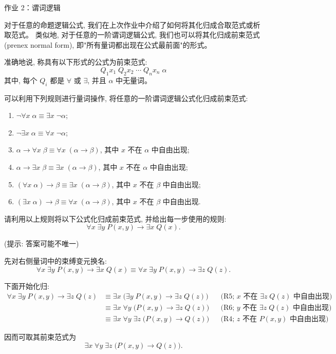\begin{frame}[allowframebreaks]{作业 2：谓词逻辑}
\begin{problem}
  对于任意的命题逻辑公式,
  我们在上次作业中介绍了如何将其化归成合取范式或析取范式。
  类似地, 对于任意的一阶谓词逻辑公式,
  我们也可以将其化归成前束范式 (prenex normal form),
  即"所有量词都出现在公式最前面"的形式。

  准确地说, 称具有以下形式的公式为前束范式:
  \[
    Q_1 x_1\; Q_2 x_2\; \cdots\; Q_n x_n\; \alpha
  \]
  其中, 每个 $Q_i$ 都是 $\forall$ 或 $\exists$,
  并且 $\alpha$ 中无量词。

  可以利用下列规则进行量词操作, 将任意的一阶谓词逻辑公式化归成前束范式:
  \begin{enumerate}
    \item[(R1)] $\lnot \forall x\; \alpha \equiv \exists x\; \lnot \alpha$;
    \item[(R2)] $\lnot \exists x\; \alpha \equiv \forall x\; \lnot \alpha$;
    \item[(R3)] $\alpha \to \forall x\; \beta \equiv \forall x\; (\alpha \to \beta)$,
      其中 $x$ 不在 $\alpha$ 中自由出现;
    \item[(R4)] $\alpha \to \exists x\; \beta \equiv \exists x\; (\alpha \to \beta)$,
      其中 $x$ 不在 $\alpha$ 中自由出现;
    \item[(R5)] $(\forall x\; \alpha) \to \beta \equiv \exists x\; (\alpha \to \beta)$,
      其中 $x$ 不在 $\beta$ 中自由出现;
    \item[(R6)] $(\exists x\; \alpha) \to \beta \equiv \forall x\; (\alpha \to \beta)$,
      其中 $x$ 不在 $\beta$ 中自由出现.
  \end{enumerate}

  请利用以上规则将以下公式化归成前束范式,
  并给出每一步使用的规则:
  \[
    \forall x\; \exists y\; P(x, y) \to \exists x\; Q(x).
  \]

  (提示: 答案可能不唯一)
\end{problem}

\begin{solution}
  先对右侧量词中的束缚变元换名:
  \[
    \forall x\; \exists y\; P(x, y) \to \exists x\; Q(x)
    \equiv
    \forall x\; \exists y\; P(x, y) \to \exists z\; Q(z).
  \]

  下面开始化归:
  \begin{align*}
    \forall x\; \exists y\; P(x, y) \to \exists z\; Q(z)
      &\equiv \exists x\; \big(\exists y\; P(x, y) \to \exists z\; Q(z)\big)
        && \text{(R5; $x$ 不在 $\exists z\; Q(z)$ 中自由出现)} \\
      &\equiv \exists x\; \forall y\; \big(P(x, y) \to \exists z\; Q(z)\big)
        && \text{(R6; $y$ 不在 $\exists z\; Q(z)$ 中自由出现)} \\
      &\equiv \exists x\; \forall y\; \exists z\; \big(P(x, y) \to Q(z)\big)
        && \text{(R4; $z$ 不在 $P(x, y)$ 中自由出现)}.
  \end{align*}

  因而可取其前束范式为
  \[
    \boxed{\exists x\; \forall y\; \exists z\; \big(P(x, y) \to Q(z)\big)}.
  \]
\end{solution}

\end{frame}
